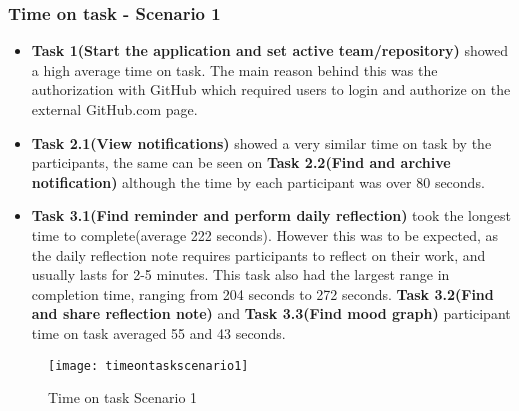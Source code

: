 \subsubsection{Time on task - Scenario 1}
\begin{itemize}
	\item \textbf{Task 1(Start the application and set active team/repository)} showed a high average time on task. The main reason behind this was the authorization with GitHub which required users to login and authorize on the external GitHub.com page.
	\item \textbf{Task 2.1(View notifications)} showed a very similar time on task by the participants, the same can be seen on \textbf{Task 2.2(Find and archive notification)} although the time by each participant was over 80 seconds.
	\item \textbf{Task 3.1(Find reminder and perform daily reflection)} took the longest time to complete(average 222 seconds). However this was to be expected, as the daily reflection note requires participants to reflect on their work, and usually lasts for 2-5 minutes. This task also had the largest range in completion time, ranging from 204 seconds to 272 seconds. \textbf{Task 3.2(Find and share reflection note)} and \textbf{Task 3.3(Find mood graph)} participant time on task averaged 55 and 43 seconds. 
\end{itemize}
\begin{figure}[h!]
    \centering
        \texttt{[image: timeontaskscenario1]}
    \caption{Time on task Scenario 1}
    \label{timeontaskscenario1}
\end{figure}
